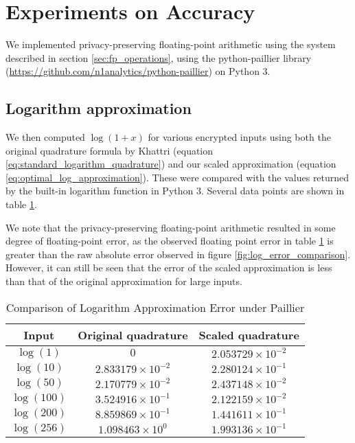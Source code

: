 \section{Experiments on Accuracy}
We implemented privacy-preserving floating-point arithmetic using the system described in section \ref{sec:fp_operations}, using the python-paillier library (\url{https://github.com/n1analytics/python-paillier}) on Python 3.

\subsection{Logarithm approximation}
We then computed $\log(1+x)$ for various encrypted inputs using both the original quadrature formula by Khattri (equation \ref{eq:standard_logarithm_quadrature}) and our scaled approximation (equation \ref{eq:optimal_log_approximation}). These were compared with the values returned by the built-in logarithm function in Python 3. Several data points are shown in table \ref{tab:log_approximation}.

We note that the privacy-preserving floating-point arithmetic resulted in some degree of floating-point error, as the observed floating point error in table \ref{tab:log_approximation} is greater than the raw absolute error observed in figure \ref{fig:log_error_comparison}. However, it can still be seen that the error of the scaled approximation is less than that of the original approximation for large inputs.
\begin{table}
	\caption{Comparison of Logarithm Approximation Error under Paillier}
	\label{tab:log_approximation}
	\begin{tabular}{ccc}
		\toprule
		Input & Original quadrature & Scaled quadrature\\
		\midrule
		$\log(1)$ & $0$ & $2.053729 \times 10^{-2}$\\
		$\log(10)$ & $2.833179 \times 10^{-2} $ & $2.280124 \times 10^{-1}$\\
		$\log(50)$ & $2.170779 \times 10^{-2}$ & $2.437148 \times 10^{-2}$\\
		$\log(100)$ & $3.524916 \times 10^{-1}$ & $2.122159 \times 10^{-2}$\\
		$\log(200)$ & $8.859869 \times 10^{-1}$ & $1.441611 \times 10^{-1}$\\
		$\log(256)$ & $1.098463 \times 10^{0}$ & $1.993136 \times 10^{-1}$\\
	\bottomrule
\end{tabular}
\end{table}

